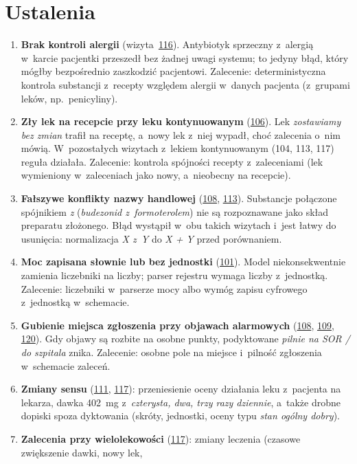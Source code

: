 \documentclass[11pt,a4paper]{article}
\newcommand{\wizyta}[1]{\hyperref[wizyta:#1]{#1}}
\begin{document}
\section{Ustalenia}

\begin{enumerate}[label=U\arabic*.]
  \item \textbf{Brak kontroli alergii} (wizyta~\wizyta{116}). Antybiotyk sprzeczny z~alergią w~karcie pacjentki przeszedł
        bez żadnej uwagi systemu; to jedyny błąd, który mógłby bezpośrednio zaszkodzić pacjentowi.
        Zalecenie: deterministyczna kontrola substancji z~recepty względem alergii w~danych pacjenta (z~grupami leków,
        np.\ penicyliny).
  \item \textbf{Zły lek na recepcie przy leku kontynuowanym} (\wizyta{106}). Lek \emph{zostawiamy bez zmian} trafił na receptę,
        a~nowy lek z~niej wypadł, choć zalecenia o~nim mówią. W~pozostałych wizytach z~lekiem kontynuowanym (104, 113, 117) reguła
        działała. Zalecenie: kontrola spójności recepty z~zaleceniami (lek wymieniony w~zaleceniach jako nowy, a~nieobecny na recepcie).
  \item \textbf{Fałszywe konflikty nazwy handlowej} (\wizyta{108}, \wizyta{113}). Substancje połączone spójnikiem
        \emph{z} (\emph{budezonid z~formoterolem}) nie są rozpoznawane jako skład preparatu złożonego. Błąd wystąpił w~obu takich
        wizytach i~jest łatwy do usunięcia: normalizacja \emph{X z~Y} do \emph{X + Y} przed porównaniem.
  \item \textbf{Moc zapisana słownie lub bez jednostki} (\wizyta{101}). Model niekonsekwentnie
        zamienia liczebniki na liczby; parser rejestru wymaga liczby z~jednostką. Zalecenie: liczebniki w~parserze mocy
        albo wymóg zapisu cyfrowego z~jednostką w~schemacie.
  \item \textbf{Gubienie miejsca zgłoszenia przy objawach alarmowych} (\wizyta{108}, \wizyta{109}, \wizyta{120}).
        Gdy objawy są rozbite na osobne punkty, podyktowane \emph{pilnie na SOR / do szpitala} znika. Zalecenie: osobne pole
        na miejsce i~pilność zgłoszenia w~schemacie zaleceń.
  \item \textbf{Zmiany sensu} (\wizyta{111}, \wizyta{117}): przeniesienie oceny działania leku z~pacjenta na lekarza,
        dawka 402~mg z~\emph{czterysta, dwa, trzy razy dziennie}, a~także drobne dopiski spoza dyktowania (skróty, jednostki,
        oceny typu \emph{stan ogólny dobry}).
  \item \textbf{Zalecenia przy wielolekowości} (\wizyta{117}): zmiany leczenia (czasowe zwiększenie dawki, nowy lek,

\end{enumerate}
\end{document}
